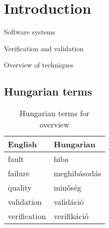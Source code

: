 \chapter{Introduction}
\label{cha:introduction}

Software systems \cite{ieee-24765}

Verification and validation

Overview of techniques


\section{Hungarian terms}


\begin{table}
    \centering
    \small
    \caption{Hungarian terms for overview}
    \begin{tabular}{ll}
        \toprule
        \textbf{English} & \textbf{Hungarian} \\
        \midrule
        fault & hiba \\
        failure & meghibásodás \\
        quality & minőség \\
        validation & validáció \\
        verification & verifikáció \\
        \bottomrule
    \end{tabular}
    \label{tab:overview:hungarian-terms-overview}
\end{table} 